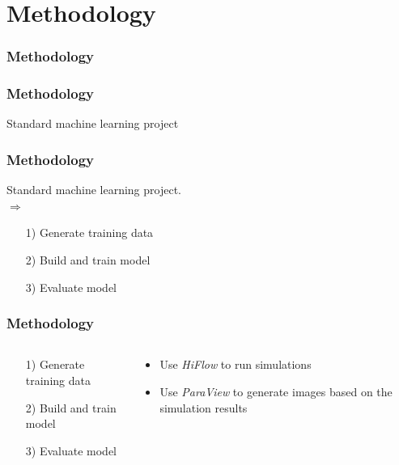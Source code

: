 \documentclass[18pt]{beamer}
\newcommand{\semitransp}[2][35]{\color{fg!#1}#2 \color{fg}}
\begin{document}
\section{Methodology}
\begin{frame}[t]
  \frametitle{Methodology}
\end{frame}


\begin{frame}[t]
  \frametitle{Methodology}
  Standard machine learning project\\
\end{frame}

\begin{frame}[t]
  \frametitle{Methodology}
  Standard machine learning project.\\
  $\Longrightarrow$
  \begin{itemize}
  \item[1)] Generate training data
  \item[2)] Build and train model
  \item[3)] Evaluate model
  \end{itemize}
\end{frame}

\begin{frame}[t]
  \frametitle{Methodology}
  \begin{columns}[t]
    \begin{column}{0.4\textwidth}
      \begin{itemize}
      \item[1)] Generate training data
      \item[2)] \semitransp{Build and train model}
      \item[3)] \semitransp{Evaluate model}
      \end{itemize}
    \end{column}
    \begin{column}{0.6\textwidth}
      \begin{itemize}
      \item Use \textit{HiFlow} to run simulations
      \item Use \textit{ParaView} to generate images based on the simulation results
      \end{itemize}
    \end{column}
  \end{columns}
\end{frame}
\end{document}
